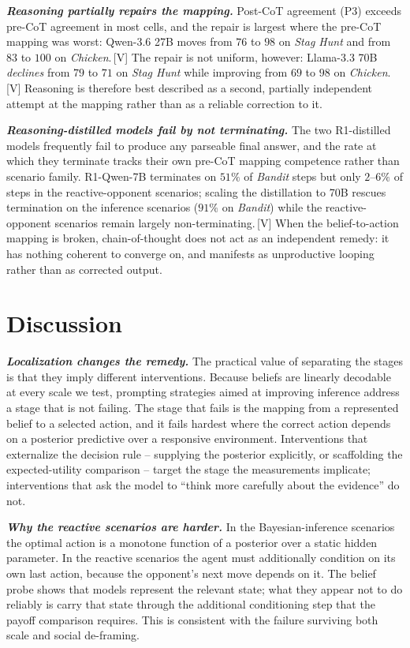 \textbf{\textit{Reasoning partially repairs the mapping.}}
Post-CoT agreement (P3) exceeds pre-CoT agreement in most cells, and the repair
is largest where the pre-CoT mapping was worst: Qwen-3.6 27B moves from $76$ to
$98$ on \textit{Stag Hunt} and from $83$ to $100$ on \textit{Chicken}.\,[V]
The repair is not uniform, however: Llama-3.3 70B \emph{declines} from $79$ to
$71$ on \textit{Stag Hunt} while improving from $69$ to $98$ on
\textit{Chicken}.\,[V] Reasoning is therefore best described as a second,
partially independent attempt at the mapping rather than as a reliable
correction to it.

\textbf{\textit{Reasoning-distilled models fail by not terminating.}}
The two R1-distilled models frequently fail to produce any parseable final
answer, and the rate at which they terminate tracks their own pre-CoT mapping
competence rather than scenario family. R1-Qwen-7B terminates on $51\%$ of
\textit{Bandit} steps but only $2$--$6\%$ of steps in the reactive-opponent
scenarios; scaling the distillation to 70B rescues termination on the
inference scenarios ($91\%$ on \textit{Bandit}) while the reactive-opponent
scenarios remain largely non-terminating.\,[V] When the belief-to-action
mapping is broken, chain-of-thought does not act as an independent remedy: it
has nothing coherent to converge on, and manifests as unproductive looping
rather than as corrected output.

\section{Discussion}

\textbf{\textit{Localization changes the remedy.}}
The practical value of separating the stages is that they imply different
interventions. Because beliefs are linearly decodable at every scale we test,
prompting strategies aimed at improving inference address a stage that is not
failing. The stage that fails is the mapping from a represented belief to a
selected action, and it fails hardest where the correct action depends on a
posterior predictive over a responsive environment. Interventions that
externalize the decision rule -- supplying the posterior explicitly, or
scaffolding the expected-utility comparison -- target the stage the measurements
implicate; interventions that ask the model to ``think more carefully about the
evidence'' do not.

\textbf{\textit{Why the reactive scenarios are harder.}}
In the Bayesian-inference scenarios the optimal action is a monotone function
of a posterior over a static hidden parameter. In the reactive scenarios the
agent must additionally condition on its own last action, because the
opponent's next move depends on it. The belief probe shows that models
represent the relevant state; what they appear not to do reliably is carry that
state through the additional conditioning step that the payoff comparison
requires. This is consistent with the failure surviving both scale and social
de-framing.

